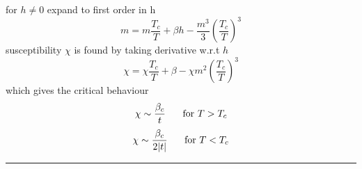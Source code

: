 \documentclass[table,cmyk]{article}
\begin{document}
\begin{longtable}
for $h\ne 0$ expand to first order in h
\[m=m\frac{T_c}{T} + \beta h - \frac{m^3}{3}\left(\frac{T_c}{T}\right)^3\]
susceptibility $\chi$ is found by taking derivative w.r.t $h$
\[\chi = \chi\frac{T_c}{T} + \beta - \chi m^2\left(\frac{T_c}{T}\right)^3\]
which gives the critical behaviour
\[\chi \sim \frac{\beta_c}{t} \text{\hspace{0.5cm} for } T>T_c\]
\[\chi \sim \frac{\beta_c}{2|t|} \text{\hspace{0.5cm} for } T<T_c\]
\noindent\rule{9cm}{0.4pt}
\tabularnewline\hline

\end{longtable}
\end{document}
